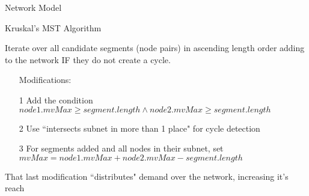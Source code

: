 \documentclass{beamer}
\begin{document}
\begin{frame}{Network Model}
  \begin{center}
  Kruskal's MST Algorithm


  Iterate over all candidate segments (node pairs) in ascending length order adding to the network IF they do not create a cycle.

  \bigskip 

  \begin{itemize}
  \item[] Modifications:
  \item[1] Add the condition {\tiny $node1.mvMax \geq segment.length \wedge node2.mvMax \geq segment.length$}
  \item[2] Use ``intersects subnet in more than 1 place" for cycle detection
  \item[3] For segments added and all nodes in their subnet, set {\tiny $mvMax = node1.mvMax + node2.mvMax - segment.length$}
  \end{itemize}
  That last modification ``distributes" demand over the network, increasing it's reach

  \end{center}
\end{frame}
  
\end{document}
